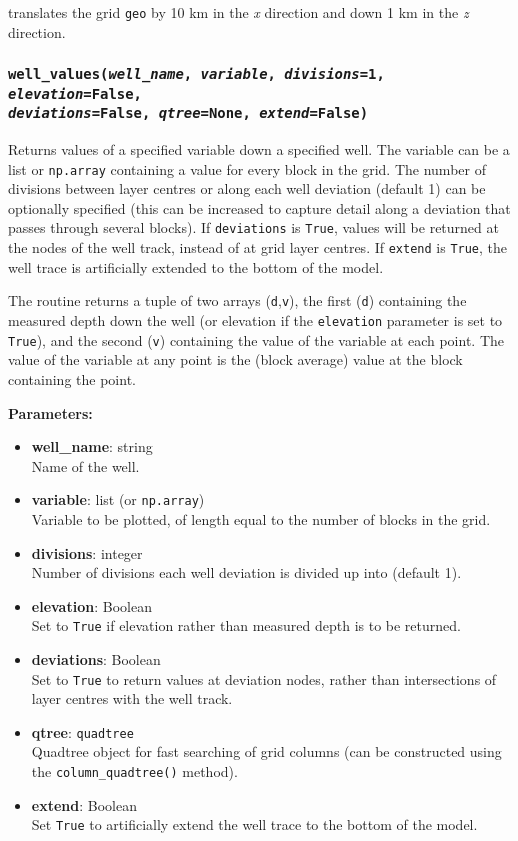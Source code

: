 translates the grid \texttt{geo} by 10 km in the \emph{x} direction and down 1 km in the \emph{z} direction.

\subsubsection{\texttt{well\_values(\emph{well\_name}, \emph{variable}, \emph{divisions}=1, \emph{elevation}=\texttt{False}, \\
    \emph{deviations}=\texttt{False}, \emph{qtree}=None, \emph{extend}=\texttt{False})}}
\label{sec:well_values}

Returns values of a specified variable down a specified well.  The variable can be a list or \texttt{np.array} containing a value for every block in the grid.  The number of divisions between layer centres or along each well deviation (default 1) can be optionally specified (this can be increased to capture detail along a deviation that passes through several blocks).  If \texttt{deviations} is \texttt{True}, values will be returned at the nodes of the well track, instead of at grid layer centres.  If \texttt{extend} is \texttt{True}, the well trace is artificially extended to the bottom of the model.

The routine returns a tuple of two arrays (\texttt{d},\texttt{v}), the first (\texttt{d}) containing the measured depth down the well (or elevation if the \texttt{elevation} parameter is set to \texttt{True}), and the second (\texttt{v}) containing the value of the variable at each point.  The value of the variable at any point is the (block average) value at the block containing the point.

\textbf{Parameters:}
\begin{itemize}
\item \textbf{well\_name}: string\\
  Name of the well.
\item \textbf{variable}: list (or \texttt{np.array})\\
  Variable to be plotted, of length equal to the number of blocks in the grid.
\item \textbf{divisions}: integer\\
  Number of divisions each well deviation is divided up into (default 1).
\item \textbf{elevation}: Boolean\\
  Set to \texttt{True} if elevation rather than measured depth is to be returned.
\item \textbf{deviations}: Boolean\\
  Set to \texttt{True} to return values at deviation nodes, rather than intersections of layer centres with the well track.
\item \textbf{qtree}: \texttt{quadtree}\\
  Quadtree object for fast searching of grid columns (can be constructed using the \texttt{column\_quadtree()} method).
\item \textbf{extend}: Boolean\\
  Set \texttt{True} to artificially extend the well trace to the bottom of the model.
\end{itemize}

